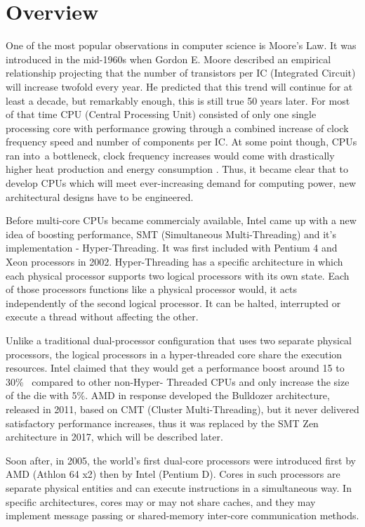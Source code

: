 \chapter{Overview}
One of the most popular observations in computer science is Moore's Law.
It was introduced in the mid-1960s when Gordon E. Moore described an empirical relationship \cite{Moore1965}
projecting that the number of transistors per IC (Integrated Circuit) will increase twofold every year.
He predicted that this trend will continue for at least a decade, but remarkably enough, this is still true 50 years later.
For most of that time CPU (Central Processing Unit) consisted of only one single processing core with performance growing through a combined increase of clock frequency speed and number of components per IC. At some point though, CPUs ran into~a bottleneck, clock frequency increases would come with drastically higher heat production and energy consumption \cite{Illinois}. Thus, it became clear that to develop CPUs which will meet ever-increasing demand for computing power, new architectural designs have to be engineered.

Before multi-core CPUs became commercialy available, Intel came up with a new idea of boosting performance, SMT (Simultaneous Multi-Threading) and it's implementation - Hyper-Threading. It was first included with Pentium 4 and Xeon processors in 2002. Hyper-Threading has a specific architecture in which each physical processor supports two logical processors with its own state. Each of those processors functions like a physical processor would, it acts independently of the second logical processor. It can be halted, interrupted or execute a thread without affecting the other.

Unlike a traditional dual-processor configuration that uses two separate physical processors, the logical processors in a hyper-threaded core share the execution resources. Intel claimed that they would get a performance boost around 15 to 30\%~\cite{intel} compared to other non-Hyper-
Threaded CPUs and only increase the size of the die with 5\%. AMD in response developed the Bulldozer architecture, released in 2011, based on CMT (Cluster Multi-Threading), but it never delivered satisfactory performance increases, thus it was replaced by the SMT Zen architecture in 2017, which will be described later.

Soon after, in 2005, the world's first dual-core processors were introduced first by AMD (Athlon 64 x2) then by Intel (Pentium D). Cores in such processors are separate physical entities and can execute instructions in a simultaneous way. In specific architectures, cores may or may not share caches, and they may implement message passing or shared-memory inter-core communication methods. 

